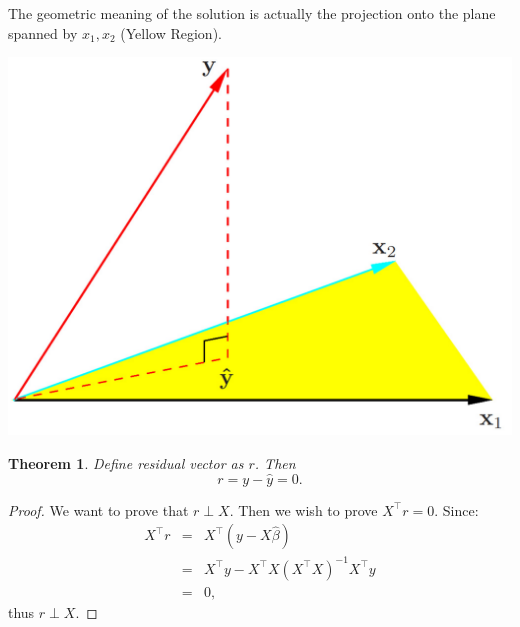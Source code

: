 \documentclass{article}
\theoremstyle{MyNonumberplain}
\theoremstyle{break}
\newtheorem*{proof}{Proof. }
\newcommand{\T}{^\intercal}
\theoremstyle{break}
\newtheorem{theorem}{Theorem}[section]
\theoremstyle{break}
\theoremstyle{break}
\begin{document}
The geometric meaning of the solution is actually the projection onto the plane spanned by $x_1,x_2$ (Yellow Region). 
\begin{center}
    \includegraphics[scale=0.1]{Images/img9.png}
\end{center}

\begin{thmbox}
    \begin{theorem}
        Define residual vector as $r$. Then
        $$r=y-\hat{y}=0.$$
    \end{theorem}
    \begin{prfbox}
        \begin{proof}
            We want to prove that $r\perp X$. Then we wish to prove $X\T r=0$.
            Since:
            \begin{eqnarray*}
                X\T r &=& X\T (y-X\hat{\beta}) \\
                &=& X\T y - X\T X (X\T X)^{-1} X\T y\\
                &=& 0,
            \end{eqnarray*}
            thus $r\perp X$.
        \end{proof}
    \end{prfbox}
\end{thmbox} 
\end{document}
